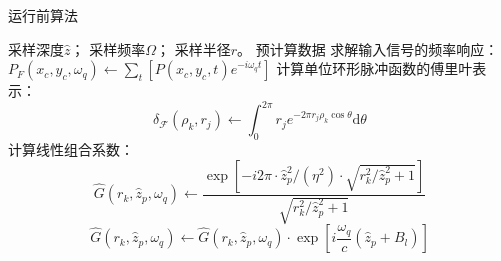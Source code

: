 \documentclass[master]{shtthesis}             %
\begin{document}
\begin{algorithm}[!t]
    \caption{运行前算法}
    \label{algo:b_rt}
    \begin{algorithmic}[1] %
        \Require 采样深度$\hat{z}$； 采样频率$\Omega$； 采样半径$r$。
        \Ensure 预计算数据%
        \State 求解输入信号的频率响应：
            \State $ P_F(x_c, y_c, \omega_q) \gets \sum_t[P(x_c, y_c, t)e^{-i\omega_q t}] $
        \EndFor
        \State 计算单位环形脉冲函数的傅里叶表示：
                \State $$ \delta_{\mathcal{F}}(\rho_k, r_j) \gets \int_0^{2\pi}r_je^{-2\pi r_j \rho_k \cos \theta} \text{d}\theta $$
            \EndFor
        \EndFor
        \State 计算线性组合系数：
                    \State $$\hat{G}(r_k, \hat{z}_p, \omega_q) \gets \frac{\exp{\left[-i2\pi\cdot\hat{z}_p^2/(\eta^2)\cdot\sqrt{r_k^2/\hat{z}_p^2+1}\right]}}{\sqrt{r_k^2/\hat{z}_p^2+1}}$$
                    \State $$ \hat{G}(r_k, \hat{z}_p, \omega_q) \gets \hat{G}(r_k, \hat{z}_p, \omega_q) \cdot \exp\left[i\frac{\omega_q}{c}(\hat{z}_p+B_l)\right] $$
                \EndFor
            \EndFor
        \EndFor
    \end{algorithmic}
\end{algorithm}
\end{document}
